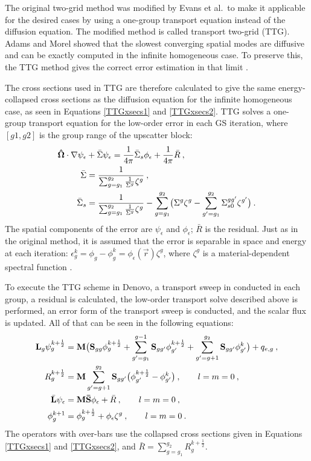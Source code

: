 The original two-grid method was modified by Evans et al.\ to make it applicable for the desired cases by using a one-group transport equation instead of the diffusion equation. The modified method is called transport two-grid (TTG). Adams and Morel showed that the slowest converging spatial modes are diffusive and can be exactly computed in the infinite homogeneous case. To preserve this, the TTG method gives the correct error estimation in that limit \cite{Evans2009d}. 

The cross sections used in TTG are therefore calculated to give the same energy-collapsed cross sections as the diffusion equation for the infinite homogeneous case, as seen in Equations \eqref{TTGxsecs1} and \eqref{TTGxsecs2}. TTG solves a one-group transport equation for the low-order error in each GS iteration, where $[g1, g2]$ is the group range of the upscatter block:
%
\begin{align}
  \mathbf{\hat{\Omega}} \cdot \nabla \psi_{\epsilon} &+ \bar{\Sigma}\psi_{\epsilon} = \frac{1}{4\pi}\bar{\Sigma}_{s}\phi_{\epsilon} + \frac{1}{4\pi}\bar{R} \:, \\
  \bar{\Sigma} &= \frac{1}{\sum_{g=g_1}^{g_2} \frac{1}{\Sigma^g}\zeta^g} \label{TTGxsecs1} \:,\\
  \bar{\Sigma}_{s} &= \frac{1}{\sum_{g=g_1}^{g_2} \frac{1}{\Sigma^g}\zeta^g} - \sum_{g=g_1}^{g_2} \bigl(\Sigma^g\zeta^g - \sum_{g'=g_1}^{g_2} \Sigma_{s0}^{gg'} \zeta^{g'} \bigr) \label{TTGxsecs2} \:. 
\end{align}
%
The spatial components of the error are $\psi_{\epsilon}$ and $\phi_{\epsilon}$; $\bar{R}$ is the residual. Just as in the original method, it is assumed that the error is separable in space and energy at each iteration: $\epsilon_g^k = \phi_g - \phi_g^k = \phi_{\epsilon}(\vec{r})\zeta^g$, where $\zeta^g$ is a material-dependent spectral function \cite{Evans2009d}. 

To execute the TTG scheme in Denovo, a transport sweep in conducted in each group, a residual is calculated, the low-order transport solve described above is performed, an error form of the transport sweep is conducted, and the scalar flux is updated. All of that can be seen in the following equations: 
\begin{align}
  \mathbf{L}_g \psi_g^{k+\frac{1}{2}} &= \mathbf{M}\bigl(\mathbf{S}_{gg}\phi_g^{k+\frac{1}{2}} + \sum_{g'=g_1}^{g-1} \mathbf{S}_{gg'}\phi_{g'}^{k+\frac{1}{2}} + \sum_{g'=g+1}^{g_2}\mathbf{S}_{gg'}\phi_{g'}^k \bigr) + q_{e,g}  \:, \\
  R^{k+\frac{1}{2}}_g &= \mathbf{M} \sum_{g'=g+1}^{g_2}\mathbf{S}_{gg'} \bigl( \phi_{g'}^{k+\frac{1}{2}} - \phi_{g'}^k \bigr) \:, \qquad l = m = 0 \:, \\
  \bar{\mathbf{L}}\psi_{\epsilon} &= \mathbf{M\bar{S}} \phi_{\epsilon} + \bar{R} \:, \qquad l = m = 0 \:, \label{TTGerrorEqn} \\
  \phi_g^{k+1} &= \phi_{g}^{k+\frac{1}{2}} + \phi_{\epsilon}\zeta^g \:, \qquad l = m = 0 \:.
\end{align}
The operators with over-bars use the collapsed cross sections given in Equations \eqref{TTGxsecs1} and \eqref{TTGxsecs2}, and $\bar{R} = \sum_{g=g_1}^{g_2} R_g^{k+\frac{1}{2}}$. 

